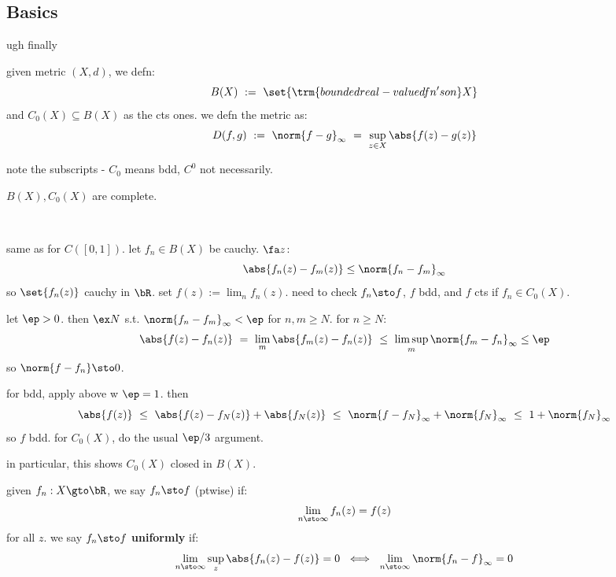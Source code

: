 \subsection{Basics}
ugh finally

\begin{defn}
    given metric $(X,d)$, we defn:
	\begin{equation*}
	    B(X) \ := \ \set{\trm{bounded real-valued fn's on } X}
	\end{equation*}
	and $C_{0}(X) \subseteq B(X)$ as the cts ones.
	we defn the metric as:
	\begin{equation*}
	    D(f,g) \ := \ \norm{f-g}_{\infty}
		\ = \ \sup_{z\in X}\abs{f(z)-g(z)}
	\end{equation*}
\end{defn}
note the subscripts - $C_{0}$ means bdd, $C^{0}$ not necessarily.

\begin{thm}
    $B(X),C_{0}(X)$ are complete.
\end{thm} \

\begin{pf}[source=Primary Source Material]
	same as for $C([0,1])$.
	let $f_{n}\in B(X)$ be cauchy. $\fa z$:
	\begin{equation*}
	    \abs{f_{n}(z)-f_{m}(z)} \leq \norm{f_{n}-f_{m}}_{\infty}
	\end{equation*}
	so $\set{f_{n}(z)}$ cauchy in $\bR$. set $f(z):=\lim_{n}f_{n}(z)$.
	need to check $f_{n}\sto f$, $f$ bdd, and $f$ cts if $f_{n}\in C_{0}(X)$.

	let $\ep>0$. then $\ex N$ s.t. $\norm{f_{n}-f_{m}}_{\infty}<\ep$ for $n,m\geq N$.
	for $n\geq N$:
	\begin{equation*}
	    \abs{f(z)-f_{n}(z)} \ = \ \lim_{m}\abs{f_{m}(z)-f_{n}(z)}
		\ \leq \ \limsup_{m}\norm{f_{m}-f_{n}}_{\infty}\leq\ep
	\end{equation*}
	so $\norm{f-f_{n}}\sto0$.

	for bdd, apply above w $\ep=1$. then
	\begin{equation*}
	    \abs{f(z)} \ \leq \ \abs{f(z)-f_{N}(z)} + \abs{f_{N}(z)}
		\ \leq \ \norm{f-f_{N}}_{\infty} + \norm{f_{N}}_{\infty} \ \leq \ 1 + \norm{f_{N}}_{\infty} \end{equation*}
	so $f$ bdd. for $C_{0}(X)$, do the usual $\ep/3$ argument.
\end{pf}
in particular, this shows $C_{0}(X)$ closed in $B(X)$.

\begin{defn}
	given $f_{n}:X\gto\bR$, we say $f_{n}\sto f$ (ptwise) if:
	\begin{equation*}
	    \lim_{n\sto\infty}f_{n}(z)=f(z)
	\end{equation*}
	for all $z$. we say $f_{n}\sto f$ \textbf{uniformly} if:
	\begin{equation*}
	    \lim_{n\sto\infty}\sup_{z}\abs{f_{n}(z)-f(z)}=0 \ \iff \
		\lim_{n\sto\infty}\norm{f_{n}-f}_{\infty}=0
	\end{equation*}
\end{defn} \

